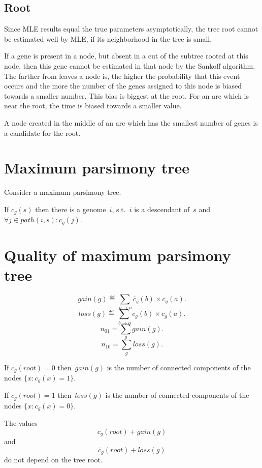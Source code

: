 \documentclass[10pt,a4paper]{article}
\theoremstyle{plain} \newtheorem{Lem}{Lemma}
\begin{document}
\subsection {Root}
Since MLE results equal the true parameters asymptotically,
the tree root cannot be estimated well by MLE, if its neighborhood in the tree is small.

If a gene is present in a node, but absent in a cut of the subtree rooted at this node, then this gene cannot be estimated in that node by the Sankoff algorithm.
The farther from leaves a node is,
the higher the probability that this event occurs
and the more the number of the genes assigned to this node is biased towards a smaller number.
This bias is biggest at the root.
For an arc which is near the root, the time is biased towards a smaller value.

A node created in the middle of an arc which has the smallest number of genes is a candidate for the root.


\section{Maximum parsimony tree}

Consider a maximum parsimony tree.

If $c_g(s)$ then there is a genome~$i$, s.t.~$i$ is a descendant of~$s$ and $\forall j \in path(i,s) : c_g(j)$.



\section{Quality of maximum parsimony tree}

$$ gain(g) \eqdef \sum_{\ b \to a}  \bar c_g(b) \times      c_g(a). $$
$$ loss(g) \eqdef \sum_{\ b \to a}       c_g(b) \times \bar c_g(a). $$
$$ n_{01} = \sum_g gain(g). $$
$$ n_{10} = \sum_g loss(g). $$

If $c_g(root) = 0$ then~$gain(g)$ is the number of connected components of the nodes $ \{x : c_g(x) = 1\}$.

If $c_g(root) = 1$ then~$loss(g)$ is the number of connected components of the nodes $ \{x : c_g(x) = 0\}$.

The values
$$ c_g(root) + gain(g) $$
and
$$ \bar c_g(root) + loss(g) $$
do not depend on the tree root.
\end{document}
